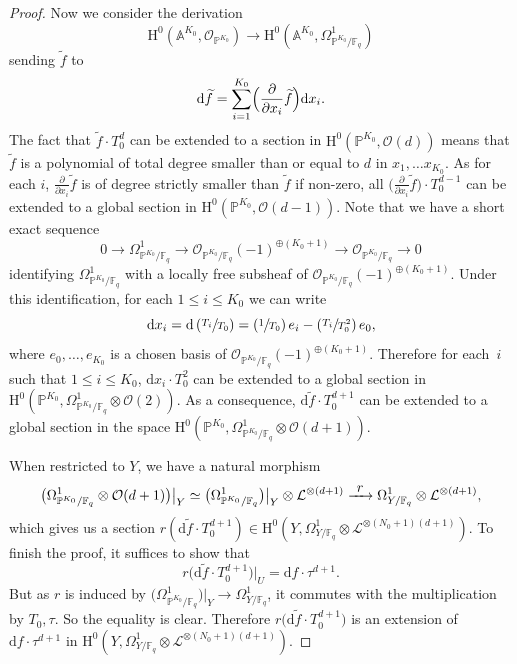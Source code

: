 \documentclass[JEP,XML,SOM,Unicode,published]{cedram}
\newcommand{\To}[1]{\mathchoice{\xrightarrow{\textstyle\kern4pt#1\kern3pt}}{\stackrel{#1}{\longrightarrow}}{}{}}
\newcommand{\Psfrac}[2]{(\sfrac{#1}{#2})}
\theoremstyle{plain}
\theoremstyle{definition}
\newcommand{\ho}{\mathrm{H}}
\newcommand{\li}{\mathcal{L}}
\newcommand{\A}{\mathbb{A}}
\newcommand{\pr}{\mathbb{P}}
\newcommand{\F}{\mathbb{F}}
\begin{document}
\begin{proof}[Proof]
Now we consider the derivation
\[
\ho^0(\A^{K_0},\mathcal{O}_{\pr^{K_0}}) \to \ho^0(\A^{K_0},\Omega_{\pr^{K_0}/\F_q}^1)
\]
sending $\widetilde{f}$ to
\[
\mathrm{d}\widetilde{f}=\sum_{i=1}^{K_0}\Bigl(\frac{\partial}{\partial x_i}\widetilde{f}\Bigr) \mathrm{d}x_i.
\]
The fact that $\widetilde{f}\cdot T_0^d$ can be extended to a section in $\ho^0(\pr^{K_0},\mathcal{O}(d))$ means that $\widetilde{f}$ is a polynomial of total degree smaller than or equal to $d$ in $x_1,\dots x_{K_0}$. As for each $i$, $\frac{\partial}{\partial x_i}\widetilde{f}$ is of degree strictly smaller than $\widetilde{f}$ if non-zero, all $\bigl(\frac{\partial}{\partial x_i}\widetilde{f}\bigr)\cdot T_0^{d-1}$ can be extended to a global section in $\ho^0(\pr^{K_0},\mathcal{O}(d-1))$. Note that we have a short exact sequence
\[
0\to \Omega_{\pr^{K_0}/\F_q}^1 \to \mathcal{O}_{\pr^{K_0}/\F_q}(-1)^{\oplus (K_0+1)} \to \mathcal{O}_{\pr^{K_0}/\F_q} \to 0
\]
identifying $\Omega_{\pr^{K_0}/\F_q}^1$ with a locally free subsheaf of $\mathcal{O}_{\pr^{K_0}/\F_q}(-1)^{\oplus (K_0+1)}$. Under this identification, for each $1\leq i\leq K_0$ we can write
\[
\mathrm{d}x_i=\mathrm{d} \left(\sfrac{T_i}{T_0} \right)=\Psfrac{1}{T_0}\,e_i-\Psfrac{T_i}{T_0^2}\,e_0,
\]
where $e_0,\dots, e_{K_0}$ is a chosen basis of $ \mathcal{O}_{\pr^{K_0}/\F_q}(-1)^{\oplus (K_0+1)} $. Therefore for each~$i$ such that $1\!\leq\! i\!\leq\! K_0$, $\mathrm{d} x_i\cdot T_0^2$ can be extended to a global section in \hbox{$\ho^0(\pr^{K_0},\Omega_{\pr^{K_0}/\F_q}^1\!\otimes\!\mathcal{O}(2))$}. As a consequence, $\mathrm{d}\widetilde{f}\cdot T_0^{d+1}$ can be extended to a global section in the space \hbox{$\ho^0(\pr^{K_0},\Omega_{\pr^{K_0}/\F_q}^1\otimes \mathcal{O}(d+1))$}.

When restricted to $Y$, we have a natural morphism
\[
\bigl(\Omega_{\pr^{K_0}/\F_q}^1\otimes \mathcal{O}(d+1)\bigr)\big|_Y\simeq \bigl(\Omega_{\pr^{K_0}/\F_q}^1\bigr)\big|_Y\otimes \li^{\otimes(d+1)}\To{r} \Omega_{Y/\F_q}^1\otimes \li^{\otimes(d+1)},
\]
which gives us a section $r(\mathrm{d}\widetilde{f}\cdot T_0^{d+1})\in \ho^0(Y, \Omega_{Y/\F_q}^1\otimes \li^{\otimes(N_0+1)(d+1)})$. To finish the proof, it suffices to show that
\[
r\bigl(\mathrm{d}\widetilde{f}\cdot T_0^{d+1}\bigr)\big|_U=\mathrm{d}f\cdot \tau^{d+1}.
\]
But as $r$ is induced by $\bigl(\Omega_{\pr^{K_0}/\F_q}^1\bigr)\big|_Y\to \Omega_{Y/\F_q}^1$, it commutes with the multiplication by $T_0, \tau$. So the equality is clear. Therefore $r\bigl(\mathrm{d}\widetilde{f}\cdot T_0^{d+1}\bigr)$ is an extension of $\mathrm{d}f\cdot \tau^{d+1}$ in $\ho^0(Y, \Omega_{Y/\F_q}^1\otimes \li^{\otimes(N_0+1)(d+1)})$.
\end{proof}
\end{document}
